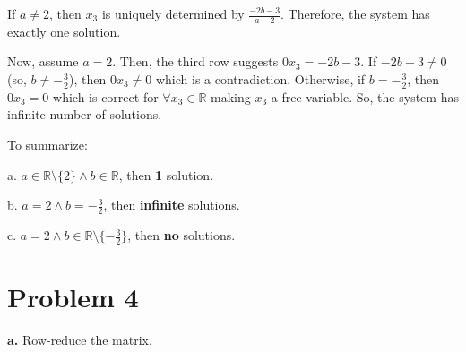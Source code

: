 \documentclass{article}
\begin{document}
If $a \ne 2$, then $x_{3}$ is uniquely determined by $\frac{-2b-3}{a - 2}$. Therefore, the system has exactly one solution.

Now, assume $a = 2$. Then, the third row suggests $0x_{3} = -2b - 3$. If $-2b - 3 \ne 0$ (so, $b \ne -\frac{3}{2}$), then $0x_{3} \ne 0$ which is a contradiction. Otherwise, if $b = -\frac{3}{2}$, then $0x_{3} = 0$ which is correct for $\forall x_{3} \in \mathbb{R}$ making $x_{3}$ a free variable. So, the system has infinite number of solutions.

To summarize:

a. $a \in \mathbb{R} \setminus \{ 2 \} \land b \in \mathbb{R}$, then \textbf{1} solution.

b. $a = 2 \land b = -\frac{3}{2}$, then \textbf{infinite} solutions.

c. $a = 2 \land b \in \mathbb{R} \setminus \{ -\frac{3}{2} \}$, then \textbf{no} solutions.

\section {Problem 4} \textbf{a.} Row-reduce the matrix.
\end{document}
